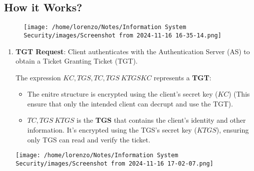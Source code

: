 \subsection{How it Works?}
\begin{figure}[h]
    \centering
    \texttt{[image: /home/lorenzo/Notes/Information System Security/images/Screenshot from 2024-11-16 16-35-14.png]}
\end{figure}
\begin{enumerate}
    \item \textbf{TGT Request}: Client authenticates with the Authentication Server (AS) to obtain a Ticket Granting Ticket (TGT).\vspace{0.5cm}
    \begin{minipage}{0.5\textwidth}
        \begin{customquote}
        The expression \({KC,TGS,{TC,TGS}\ KTGS}KC\) represents a \textbf{TGT}:
        \begin{itemize}
            \item The enitre structure is encrypted using the client's secret key (\(KC\)) (This ensure that only the intended client can decrupt and use the TGT).
            \item \({TC,TGS}\ KTGS\) is the \textbf{TGS} that contains the client’s identity and other information. It's encrypted using the TGS's secret key (\(KTGS\)), ensuring only TGS can read and verify the ticket. 

        \end{itemize}
        \end{customquote}
    \end{minipage} 
    \hspace{1cm}
    \begin{minipage}{0.3\textwidth}
        \centering
        \texttt{[image: /home/lorenzo/Notes/Information System Security/images/Screenshot from 2024-11-16 17-02-07.png]}
    \end{minipage}


\end{enumerate}
